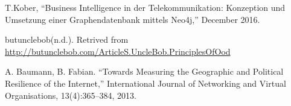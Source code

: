 \documentclass[conference, 11pt]{IEEEtran}
\begin{document}
\begin{thebibliography}{00}
T.Kober, ``Business Intelligence in der Telekommunikation: Konzeption und Umsetzung einer Graphendatenbank mittels Neo4j,'' December 2016.

butunclebob(n.d.). Retrived from \url{http://butunclebob.com/ArticleS.UncleBob.PrinciplesOfOod}


A. Baumann, B. Fabian. ``Towards Measuring the Geographic and Political Resilience of the Internet,'' International Journal of Networking and Virtual Organisations, 13(4):365–384, 2013.













\end{thebibliography}
\end{document}
